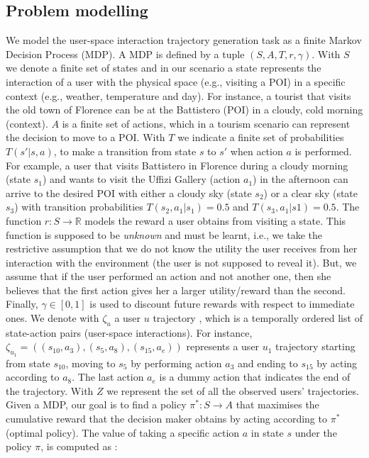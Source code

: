 \subsection{Problem modelling}
We model the user-space interaction trajectory generation task as a finite Markov Decision Process (MDP). A MDP is defined by a tuple $(S,A,T,r,\gamma)$. With $S$ we denote a finite set of states and in our scenario a state represents the interaction of a user with the physical space (e.g., visiting a POI) in a specific context (e.g., weather, temperature and day). For instance, a tourist that visits the old town of Florence can be at the Battistero (POI) in a cloudy, cold morning (context). $A$ is a finite set of actions, which in a tourism scenario can represent the decision to move to a POI. With $T$ we indicate a finite set of probabilities $T(s'| s, a)$, to make a transition from state $s$ to $s'$ when action $a$ is performed. For example, a user that visits Battistero in Florence during a cloudy morning (state $s_1$) and wants to visit the Uffizi Gallery (action $a_{1}$) in the afternoon can arrive to the desired POI with either a cloudy sky (state $s_2$) or a clear sky (state $s_3$) with transition probabilities $T(s_2,a_{1}|s_1)=0.5$ and $T(s_3,a_{1}|s1)=0.5$.
The function $r: S \rightarrow \mathbb{R}$ models the reward a user obtains from visiting a state. This function is supposed to be {\it unknown} and must be learnt, i.e., we take the restrictive assumption that we do not know the utility the user receives from her interaction with the environment (the user is not supposed to reveal it). But, we assume that if the user performed an action and not another one, then she believes that the first action gives her a larger utility/reward than the second. Finally, $\gamma \in [0,1]$ is used to discount future rewards with respect to immediate ones. 
%
We denote with $\zeta_u$ a user $u$ trajectory , which is a temporally ordered list of state-action pairs (user-space interactions). For instance, $\zeta_{u_1} = ((s_{10},a_{3}), (s_5,a_8), (s_{15}, a_e))$ represents a user $u_1$ trajectory starting from state $s_{10}$, moving to $s_5$ by performing action $a_3$ and ending to $s_{15}$ by acting according to $a_8$. The last action $a_e$ is a dummy action that indicates the end of the trajectory. With $Z$ we represent the set of all the observed users' trajectories. 
%
Given a MDP, our goal is to find a policy $\pi^* : S \rightarrow A$ that maximises the cumulative reward that the decision maker obtains by acting according to $\pi^*$ (optimal policy). 
The value of taking a specific action $a$ in state $s$ under the policy $\pi$, is computed as :

